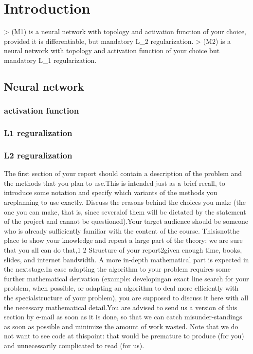 \section{Introduction}
> (M1) is a neural network with topology and activation function of your choice, provided it is differentiable, but mandatory L\_2 regularization.
> (M2) is a neural network with topology and activation function of your choice but mandatory L\_1 regularization. 
\subsection{Neural network}
\subsubsection{activation function}
\subsubsection{L1 reguralization}
\subsubsection{L2 reguralization}
The first section of your report should contain a description of the problem and the methods that you plan to use.This is intended just as a brief recall, to introduce some notation and specify which variants of the methods you areplanning to use exactly. Discuss the reasons behind the choices you make (the one you can make, that is, since severalof them will be dictated by the statement of the project and cannot be questioned).Your target audience should be someone who is already sufficiently familiar with the content of the course. Thisisnotthe place to show your knowledge and repeat a large part of the theory: we are sure that you all can do that,1
2 Structure of your report2given enough time, books, slides, and internet bandwidth. A more in-depth mathematical part is expected in the nextstage.In case adapting the algorithm to your problem requires some further mathematical derivation (example: developingan exact line search for your problem, when possible, or adapting an algorithm to deal more efficiently with the specialstructure of your problem), you are supposed to discuss it here with all the necessary mathematical detail.You are advised to send us a version of this section by e-mail as soon as it is done, so that we can catch misunder-standings as soon as possible and minimize the amount of work wasted. Note that we do not want to see code at thispoint: that would be premature to produce (for you) and unnecessarily complicated to read (for us).